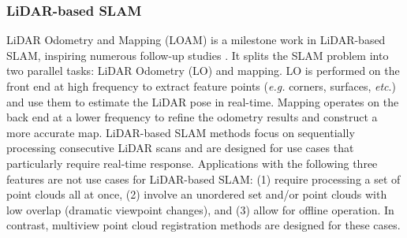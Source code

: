 \subsubsection{LiDAR-based SLAM}
LiDAR Odometry and Mapping (LOAM) \cite{loam} is a milestone work in LiDAR-based SLAM, inspiring numerous follow-up studies \cite{floam,lloam,aloam,sdk,kiss,traj}. It splits the SLAM problem into two parallel tasks: LiDAR Odometry (LO) and mapping. LO is performed on the front end at high frequency to extract feature points (\textit{e.g.} corners, surfaces, \textit{etc}.) and use them to estimate the LiDAR pose in real-time. Mapping operates on the back end at a lower frequency to refine the odometry results and construct a more accurate map. LiDAR-based SLAM methods \cite{loam,floam,lloam,aloam,sdk,kiss,traj} focus on sequentially processing consecutive LiDAR scans and are designed for use cases that particularly require real-time response. Applications with the following three features are not use cases for LiDAR-based SLAM: (1) require processing a set of point clouds all at once, (2) involve an unordered set and/or point clouds with low overlap (dramatic viewpoint changes), and (3) allow for offline operation. In contrast, multiview point cloud registration methods are designed for these cases.


